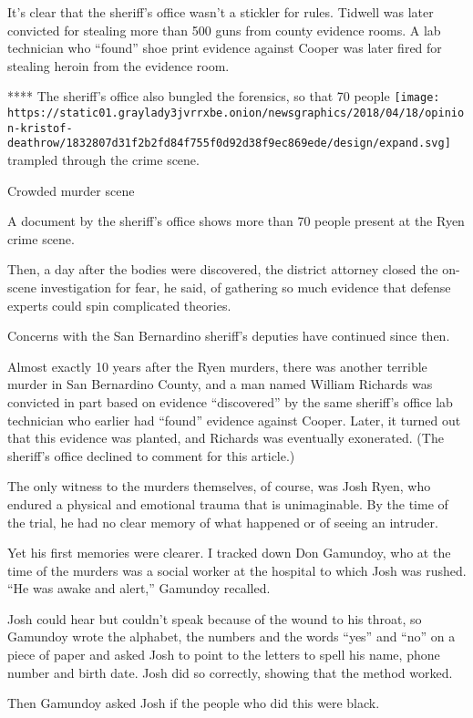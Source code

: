 It's clear that the sheriff's office wasn't a stickler for rules.
Tidwell was later convicted for stealing more than 500 guns from county
evidence rooms. A lab technician who ``found'' shoe print evidence
against Cooper was later fired for stealing heroin from the evidence
room.

**** The sheriff's office also bungled the forensics, so that 70 people
\texttt{[image: https://static01.graylady3jvrrxbe.onion/newsgraphics/2018/04/18/opinion-kristof-deathrow/1832807d31f2b2fd84f755f0d92d38f9ec869ede/design/expand.svg]}
trampled through the crime scene.

Crowded murder scene

A document by the sheriff's office shows more than 70 people present at
the Ryen crime scene.

Then, a day after the bodies were discovered, the district attorney
closed the on-scene investigation for fear, he said, of gathering so
much evidence that defense experts could spin complicated theories.

Concerns with the San Bernardino sheriff's deputies have continued since
then.

Almost exactly 10 years after the Ryen murders, there was another
terrible murder in San Bernardino County, and a man named William
Richards was convicted in part based on evidence ``discovered'' by the
same sheriff's office lab technician who earlier had ``found'' evidence
against Cooper. Later, it turned out that this evidence was planted, and
Richards was eventually exonerated. (The sheriff's office declined to
comment for this article.)

The only witness to the murders themselves, of course, was Josh Ryen,
who endured a physical and emotional trauma that is unimaginable. By the
time of the trial, he had no clear memory of what happened or of seeing
an intruder.

Yet his first memories were clearer. I tracked down Don Gamundoy, who at
the time of the murders was a social worker at the hospital to which
Josh was rushed. ``He was awake and alert,'' Gamundoy recalled.

Josh could hear but couldn't speak because of the wound to his throat,
so Gamundoy wrote the alphabet, the numbers and the words ``yes'' and
``no'' on a piece of paper and asked Josh to point to the letters to
spell his name, phone number and birth date. Josh did so correctly,
showing that the method worked.

Then Gamundoy asked Josh if the people who did this were black.

